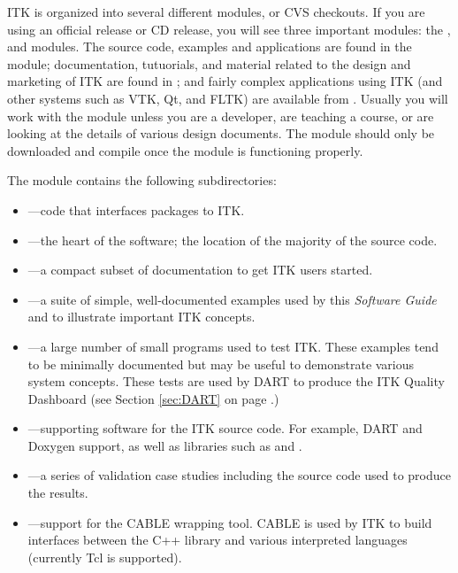 ITK is organized into several different modules, or CVS checkouts. If you are
using an official release or CD release, you will see three important modules:
the ,  and 
modules. The source code, examples and applications are found in the
 module; documentation, tutuorials, and material related to the
design and marketing of ITK are found in ; and fairly
complex applications using ITK (and other systems such as VTK, Qt, and FLTK)
are available from . Usually you will work with the
 module unless you are a developer, are teaching a course, or
are looking at the details of various design documents. The
 module should only be downloaded and compile once
the  module is functioning properly.

The  module contains the following subdirectories:
\begin{itemize}
        \item {}---code that interfaces packages
        to ITK.
        \item {}---the heart of the software; the location
        of the majority of the source code.
        \item {}---a compact subset of documentation
        to get ITK users started.
        \item {}---a suite of simple, well-documented
        examples used by this \emph{Software Guide} and to illustrate important
        ITK concepts.
        \item {}---a large number of small programs used
        to test ITK. These examples tend to be minimally documented but may
        be useful to demonstrate various system concepts. These tests are 
        used by DART to produce the ITK Quality Dashboard 
        (see Section \ref{sec:DART} on 
        page \pageref{sec:DART}.)
        \item {}---supporting software for the ITK
        source code. For example, DART and Doxygen support, as well as 
        libraries such as  and .
        \item {}---a series of validation case studies
        including the source code used to produce the results.
        \item {}---support for the CABLE wrapping tool.
        CABLE is used by ITK to build interfaces between the C++ library and
        various interpreted languages (currently Tcl is supported).
\end{itemize}

